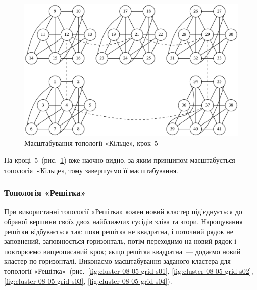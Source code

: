 \documentclass[
	a4paper,
	oneside,
	BCOR = 10mm,
	DIV = 12,
	12pt,
	headings = normal,
]{scrartcl}
\begin{document}
				\begin{figure}[!htbp]
					\centering
					\includegraphics[height=12\baselineskip]{./assets/cluster-08-04-ring-s05.pdf}
					\caption{Масштабування топології «Кільце», крок~5}
					\label{fig:cluster-08-04-ring-s05}
				\end{figure}

				На кроці~5~(рис.~\ref{fig:cluster-08-04-ring-s05}) вже наочно видно, за яким принципом масштабується топологія~«Кільце», тому завершуємо її масштабування.

			\subsubsection{Топологія «Решітка»}
				При використанні топології «Решітка» кожен новий кластер під'єднується до обраної вершини своїх двох найближчих сусідів зліва та згори. Нарощування решітки відбувається так: поки решітка не квадратна, і поточний рядок не заповнений, заповнюється горизонталь, потім переходимо на новий рядок і повторюємо вищеописаний крок; якщо решітка квадратна~— додаємо новий кластер по горизонталі. Виконаємо масштабування заданого кластера для топології «Решітка»~(рис.~\ref{fig:cluster-08-05-grid-s01}, \ref{fig:cluster-08-05-grid-s02}, \ref{fig:cluster-08-05-grid-s03}, \ref{fig:cluster-08-05-grid-s04}).
\end{document}
